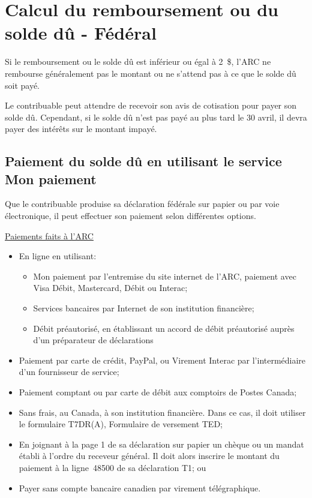 \section{Calcul du remboursement ou du solde dû - Fédéral}
Si le remboursement ou le solde dû est inférieur ou égal à 2~\$, l'ARC ne rembourse généralement pas le montant ou ne s'attend pas à ce que le solde dû soit payé.

Le contribuable peut attendre de recevoir son avis de cotisation pour payer son solde dû. Cependant, si le solde dû n'est pas payé au plus tard le 30 avril, il devra payer des intérêts sur le montant impayé.


\subsection{Paiement du solde dû en utilisant le service \og Mon paiement \fg{}}
Que le contribuable produise sa déclaration fédérale sur papier ou par voie électronique, il peut effectuer son paiement selon différentes options.

\cat\href{https://www.canada.ca/fr/agence-revenu/services/paiements/paiements-arc.html}{Paiements faits à l'ARC}

\begin{itemize}[label=]
	\item En ligne en utilisant:
	\begin{itemize}
		\item \og Mon paiement \fg{} par l'entremise du site internet de l'ARC, paiement avec Visa Débit, Mastercard, Débit ou Interac;
		\item Services bancaires par Internet de son institution financière;
		\item Débit préautorisé, en établissant un accord de débit préautorisé auprès d'un préparateur de déclarations
	\end{itemize}
	\item Paiement par carte de crédit, PayPal, ou Virement Interac par l'intermédiaire d'un fournisseur de service;
	\item Paiement comptant ou par carte de débit aux comptoirs de Postes Canada;
	\item Sans frais, au Canada, à son institution financière. Dans ce cas, il doit utiliser le formulaire T7DR(A), Formulaire de versement TED;
	\item En joignant à la page 1 de sa déclaration sur papier un chèque ou un mandat établi à l'ordre du receveur général. Il doit alors inscrire le montant du paiement à la ligne~48500 de sa déclaration T1; ou
	\item Payer sans compte bancaire canadien par virement télégraphique.
\end{itemize}


